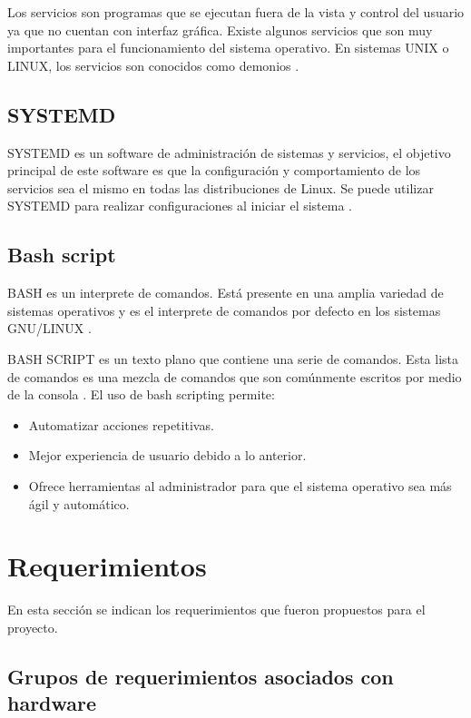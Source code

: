 Los servicios son programas que se ejecutan fuera de la vista y control del usuario ya que no cuentan con interfaz gráfica. Existe algunos servicios que son muy importantes para el funcionamiento del sistema operativo.
En sistemas UNIX o LINUX, los servicios son conocidos como demonios \citep{SERVICIO}.

\subsection{SYSTEMD}

SYSTEMD es un software de administración de sistemas y servicios, el objetivo principal de este software es que la configuración y comportamiento de los servicios sea el mismo en todas las distribuciones de Linux. Se puede utilizar SYSTEMD para realizar configuraciones al iniciar el sistema \citep{REFSYSTEMD}.

\subsection{Bash script}
BASH es un interprete de comandos. Está presente en una amplia variedad de sistemas operativos y es el interprete de comandos por defecto en los sistemas GNU/LINUX \citep{BASH}. 


BASH SCRIPT es un texto plano que contiene una serie de comandos. Esta lista de comandos es una mezcla de comandos que son comúnmente escritos por medio de la consola \citep{BASHSCRIPT}. El uso de bash scripting permite:

\begin{itemize}
\item Automatizar acciones repetitivas.
\item Mejor experiencia de usuario debido a lo anterior.
\item Ofrece herramientas al administrador para que el sistema operativo sea más ágil y automático.
\end{itemize}

\section{Requerimientos}
En esta sección se indican los requerimientos que fueron propuestos para el proyecto.

\subsection{Grupos de requerimientos asociados con hardware}

